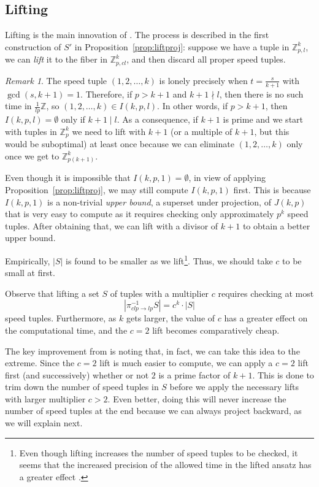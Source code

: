 \documentclass[11pt]{amsart}
\newcommand{\Z}{\mathbb{Z}}
\newcommand{\onetok}{(1, 2, \dots, k)}
\theoremstyle{definition}
\theoremstyle{remark}
\newtheorem{remark}[theorem]{Remark}
\begin{document}
\subsection{Lifting}
\label{subsec:efflift}
Lifting is the main innovation of \cite{Trakulthongchai}. 
The process is described in the first construction of $S'$ in Proposition~\ref{prop:liftproj}: suppose we have a tuple in $\Z^k_{p,l}$,
we can \emph{lift} it to the fiber in $\Z^k_{p,cl}$, and then discard all proper speed tuples.

\begin{remark}
\label{rem:tightset}
    The speed tuple $\onetok$ is lonely precisely when $t=\frac{s}{k+1}$ with $\gcd(s,k+1)=1$. 
    Therefore, if $p>k+1$ and $k+1\nmid l$, then there is no such time in $\frac{1}{lp}\Z$,
    so $\onetok\in I(k,p,l)$. 
    In other words, if $p>k+1$, then $I(k,p,l)=\emptyset$ only if $k+1\mid l$. 
    As a consequence, if $k+1$ is prime and we start with tuples in $\Z^k_{p}$
    we need to lift with $k+1$ (or a multiple of $k+1$, but this would be suboptimal)
    at least once because we can eliminate $\onetok$ only once we get to $\Z^{k}_{p(k+1)}$.
\end{remark}

Even though it is impossible that $I(k,p,1)=\emptyset$, in view of applying Proposition~\ref{prop:liftproj}, 
we may still compute $I(k,p,1)$ first.
This is because $I(k, p, 1)$ is a non-trivial \emph{upper bound}, a superset under projection, of $J(k, p)$ 
that is very easy to compute as it requires checking only approximately $p^k$ speed tuples.
After obtaining that, we can lift with a divisor of $k+1$ to obtain a better upper bound.

Empirically, $|S|$ is found to be smaller as we lift\footnote{
  Even though lifting increases the number of speed tuples to be checked,
  it seems that the increased precision of the allowed time in the lifted ansatz has a greater effect \cite{Trakulthongchai}.
}. Thus, we should take $c$ to be small at first. 

Observe that lifting a set $S$ of tuples with a multiplier $c$ requires checking at most
\[ \left| \pi^{-1}_{clp \to lp} S \right| = c^k\cdot|S| \]
speed tuples.
Furthermore, as $k$ gets larger, the value of $c$ has a greater effect on the computational time, 
and the $c=2$ lift becomes comparatively cheap.

The key improvement from \cite{Trakulthongchai} is noting that, in fact, we can take this idea to the extreme.
Since the $c=2$ lift is much easier to compute, 
we can apply a $c=2$ lift first (and successively) whether or not $2$ is a prime factor of $k+1$.
This is done to trim down the number of speed tuples in $S$ before we apply the necessary lifts with larger multiplier $c>2$.
Even better, doing this will never increase the number of speed tuples at the end because we can always project backward,
as we will explain next.
 
\end{document}

